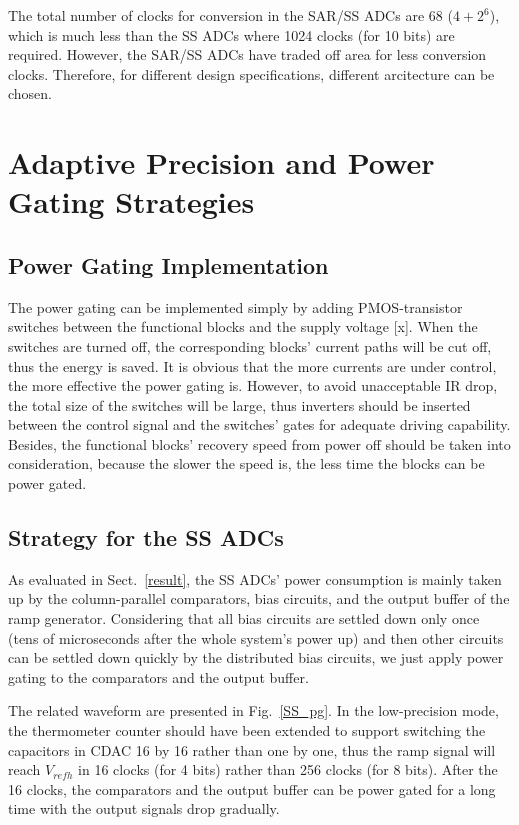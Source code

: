 \documentclass[conference]{IEEEtran}
\begin{document}
 The total number of clocks for conversion in the SAR/SS ADCs are 68 ($4+2^6$), which is much less than the SS ADCs where 1024 clocks (for 10 bits) are required. However, the SAR/SS ADCs have traded off area for less conversion clocks. Therefore, for different design specifications, different arcitecture can be chosen.

\section{Adaptive Precision and Power Gating Strategies}\label{strategy}

\subsection{Power Gating Implementation}

The power gating can be implemented simply by adding PMOS-transistor switches between the functional blocks and the supply voltage [x]. When the switches are turned off, the corresponding blocks’ current paths will be cut off, thus the energy is saved. It is obvious that the more currents are under control, the more effective the power gating is. However, to avoid unacceptable IR drop, the total size of the switches will be large, thus inverters should be inserted between the control signal and the switches’ gates for adequate driving capability. Besides, the functional blocks’ recovery speed from power off should be taken into consideration, because the slower the speed is, the less time the blocks can be power gated. 

\subsection{Strategy for the SS ADCs}
As evaluated in Sect.~\ref{result}, the SS ADCs’ power consumption is mainly taken up by the column-parallel comparators, bias circuits, and the output buffer of the ramp generator. Considering that all bias circuits are settled down only once (tens of microseconds after the whole system's power up) and then other circuits can be settled down quickly by the distributed bias circuits, we just apply power gating to the comparators and the output buffer.

The related waveform are presented in Fig.~\ref{SS_pg}. In the low-precision mode, the thermometer counter should have been extended to support switching the capacitors in CDAC 16 by 16 rather than one by one, thus the ramp signal will reach $V_{refh}$ in 16 clocks (for 4 bits) rather than 256 clocks (for 8 bits). After the 16 clocks, the comparators and the output buffer can be power gated for a long time with the output signals drop gradually.
\end{document}
